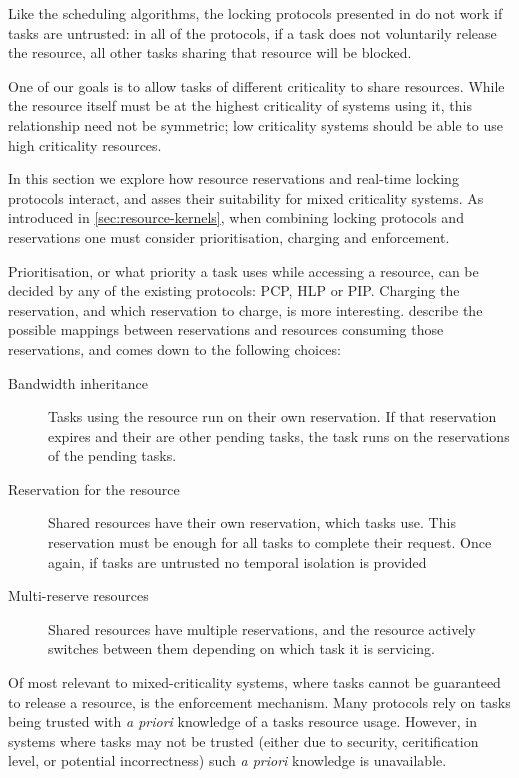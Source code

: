 Like the scheduling algorithms, the locking protocols presented in  do not work if tasks are untrusted: in all of the protocols, if a task does not voluntarily release the resource, all other tasks sharing that resource will be blocked.

One of our goals is to allow tasks of different criticality to share resources. 
While the resource itself must be at the highest criticality of systems using it, this relationship need not be symmetric; low criticality systems should be able to use high criticality resources.

In this section we explore how resource reservations and real-time locking protocols interact, and asses their suitability for mixed criticality systems.
As introduced in \cref{sec:resource-kernels}, when combining locking protocols and reservations one must consider prioritisation, charging and enforcement.

Prioritisation, or what priority a task uses while accessing a resource, can be decided by any of the existing protocols: \gls{PCP}, \gls{HLP} or \gls{PIP}. 
Charging the reservation, and which reservation to charge, is more interesting. 
\citet{deNiz_LSR_01} describe the possible mappings between reservations and resources consuming those reservations, and comes down to the following choices:

\begin{description}
\item[Bandwidth inheritance] Tasks using the resource run on their own reservation.
If that reservation expires and their are other pending tasks, the task runs on the reservations of the pending tasks. 
\item[Reservation for the resource] Shared resources have their own reservation, which tasks use.
This reservation must be enough for all tasks to complete their request. 
Once again, if tasks are untrusted no temporal isolation is provided 
\item[Multi-reserve resources] Shared resources have multiple reservations, and the resource actively switches between them depending on which task it is servicing. 
\end{description} 

Of most relevant to mixed-criticality systems, where tasks cannot be guaranteed to release a resource, is the enforcement mechanism.
Many protocols rely on tasks being trusted with \emph{a priori} knowledge of a tasks resource usage. 
However, in systems where tasks may not be trusted (either due to security, ceritification level, or potential incorrectness) such \emph{a priori} knowledge is unavailable. 


